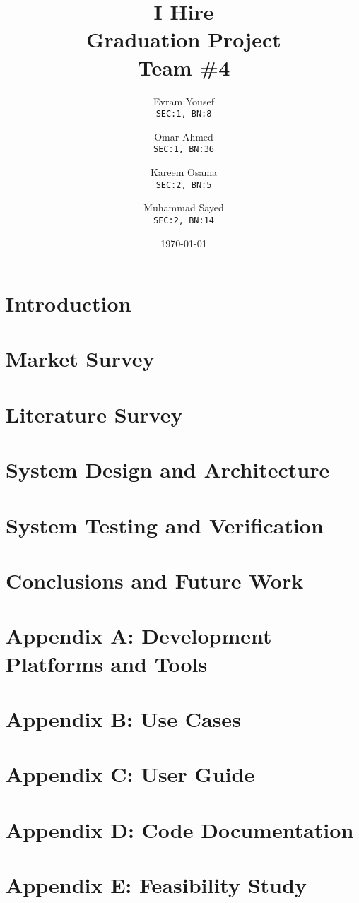 \documentclass[12pt]{report}
\title{\textbf{I Hire} \\
Graduation Project \\
Team \#4}
\author{
  Evram Yousef\\
  \small\texttt{SEC:1, BN:8}
  \and
  Omar Ahmed\\
  \small\texttt{SEC:1, BN:36}
  \and
  Kareem Osama\\
  \small\texttt{SEC:2, BN:5}
  \and
  Muhammad Sayed\\
  \small\texttt{SEC:2, BN:14}
}
\date{\today}
\begin{document}
\thispagestyle{empty}

\maketitle
\tableofcontents
\listoffigures
\listoftables
\clearpage


\part{Introduction}




\part{Market Survey}


\part{Literature Survey}


\part{System Design and Architecture}


\part{System Testing and Verification}


\part{Conclusions and Future Work}


%

\part{Appendix A: Development Platforms and Tools}


\part{Appendix B: Use Cases}


\part{Appendix C: User Guide}


\part{Appendix D: Code Documentation}


\part{Appendix E: Feasibility Study}

\end{document}

